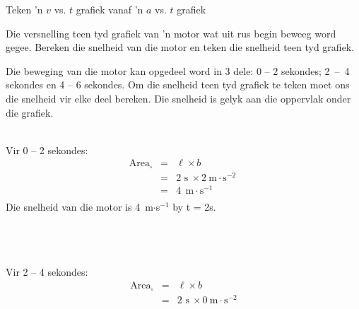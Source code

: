 \begin{wex}{Teken 'n $v$ vs. $t$ grafiek vanaf 'n $a$ vs. $t$ grafiek}
{Die versnelling teen tyd grafiek van 'n motor wat uit rus begin beweeg word gegee. Bereken die snelheid van die motor en teken die snelheid teen tyd grafiek.
\begin{center}
\end{center}}
{
Die beweging van die motor kan opgedeel word in 3 dele: 0 -- 2 sekondes; 2~--~4 sekondes en 4 -- 6 sekondes. Om die snelheid teen tyd grafiek te teken moet ons die snelheid vir elke deel bereken. Die snelheid is gelyk aan die oppervlak onder die grafiek.\\
\\
\begin{minipage}{0.3\textwidth}
Vir 0 -- 2 sekondes:
\begin{eqnarray*}
\text{Area}_{\square} &=& \ell \times b\\
&=& 2\text{~s}\ \times 2~\text{m}\cdot \text{s}^{-2}\ \\
&=&4\ ~\text{m}\cdot \text{s}^{-1}\\
\end{eqnarray*}
Die snelheid van die motor is 4~m$\cdot$s$^{-1}$ by t = 2s.\\
\\
\\
\\
\end{minipage}
\begin{minipage}{0.03\textwidth}
\begin{center}
\end{center}
\end{minipage}
\begin{minipage}{0.3\textwidth}
Vir 2 -- 4 sekondes:
\begin{eqnarray*}
\text{Area}_{\square} &=& \ell \times b\\
&=& 2\text{~s}\ \times 0~\text{m}\cdot \text{s}^{-2}\\

\end{eqnarray*}
\end{minipage}}
\end{wex}
